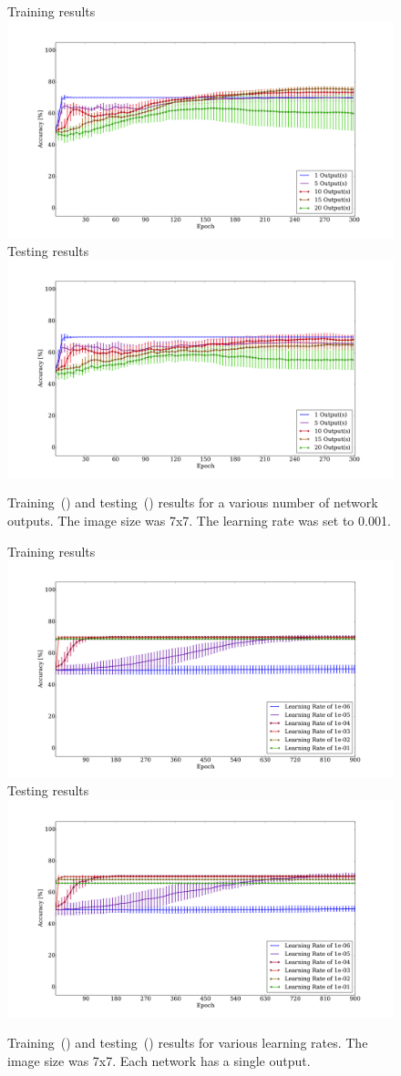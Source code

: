 \documentclass[10pt,journal]{IEEEtran}
\begin{document}
				\begin{figure}[t!]
					\captionsetup[subfigure]{position=b}
					\centering
					\hfill
					\subcaptionbox
					{
						Training results
						\label{fig:sw_outputs:training}
					}
					{\includegraphics[width=0.49\linewidth]{sw_outputs_training}}
					\hfill
					\subcaptionbox
					{
						Testing results
						\label{fig:sw_outputs:testing}
					}
					{\includegraphics[width=0.49\linewidth]{sw_outputs_testing}}
					\hfill
					\caption{Training~() and testing~() results for a various number of network outputs. The image size was 7x7. The learning rate was set to 0.001.}
					\label{fig:sw_outputs}
				\end{figure}
				
				\begin{figure}[t!]
					\captionsetup[subfigure]{position=b}
					\centering
					\hfill
					\subcaptionbox
					{
						Training results
						\label{fig:sw_learning_rate:training}
					}
					{\includegraphics[width=0.49\linewidth]{sw_learning_rate_training}}
					\hfill
					\subcaptionbox
					{
						Testing results
						\label{fig:sw_learning_rate:testing}
					}
					{\includegraphics[width=0.49\linewidth]{sw_learning_rate_testing}}
					\hfill
					\caption{Training~() and testing~() results for various learning rates. The image size was 7x7. Each network has a single output.}
					\label{fig:sw_learning_rate}
				\end{figure}
			
\end{document}

